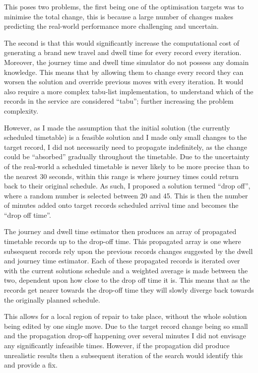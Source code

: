 \documentclass{article}
\begin{document}
\par 
This poses two problems, the first being one of the optimisation targets was to minimise the total change, this is because a large number of changes makes predicting the real-world performance more challenging and uncertain. 

\par
The second is that this would significantly increase the computational cost of generating a brand new travel and dwell time for every record every iteration. Moreover, the journey time and dwell time simulator do not possess any domain knowledge. This means that by allowing them to change every record they can worsen the solution and override previous moves with every iteration. It would also require a more complex tabu-list implementation, to understand which of the records in the service are considered ``tabu''; further increasing the problem complexity.   

\par 
However, as I made the assumption that the initial solution (the currently scheduled timetable) is a feasible solution and I made only small changes to the target record, I did not necessarily need to propagate indefinitely, as the change could be ``absorbed'' gradually throughout the timetable. Due to the uncertainty of the real-world a scheduled timetable is never likely to be more precise than to the nearest 30 seconds, within this range is where journey times could return back to their original schedule. As such, I proposed a solution termed ``drop off'', where a random number is selected between 20 and 45. This is then the number of minutes added onto target records scheduled arrival time and becomes the ``drop off time''. 


\par 
The journey and dwell time estimator then produces an array of propagated timetable records up to the drop-off time. This propagated array is one where subsequent records rely upon the previous records changes suggested by the dwell and journey time estimator. Each of these propagated records is iterated over with the current solutions schedule and a weighted average is made between the two, dependent upon how close to the drop off time it is. This means that as the records get nearer towards the drop-off time they will slowly diverge back towards the originally planned schedule. 

\par 
This allows for a local region of repair to take place, without the whole solution being edited by one single move. Due to the target record change being so small and the propagation drop-off happening over several minutes I did not envisage any significantly infeasible times. However, if the propagation did produce unrealistic results then a subsequent iteration of the search would identify this and provide a fix. 
\end{document}
